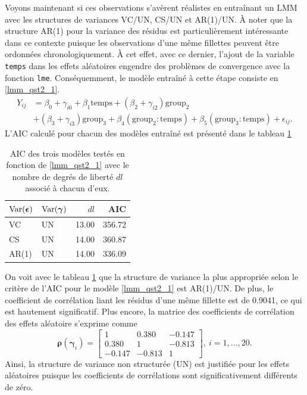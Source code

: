 \documentclass{article}
\begin{document}
		Voyons maintenant si ces observations s'avèrent réalistes en entraînant un LMM avec les structures de variances VC/UN, CS/UN et AR(1)/UN. À noter que la structure AR(1) pour la variance des résidus est particulièrement intéressante dans ce contexte puisque les observations d'une même fillettes peuvent être ordonnées chronologiquement.
		À cet effet, avec ce dernier, l'ajout de la variable \texttt{temps} dans les effets aléatoires engendre des problèmes de convergence avec la fonction \texttt{lme}. Conséquemment, le modèle entraîné à cette étape consiste en \eqref{lmm_qst2_1}.
		\begin{align}\label{lmm_qst2_1}
			Y_{ij} &= \beta_0 + \gamma_{i0} + \beta_1 \mathrm{temps} + (\beta_2 + \gamma_{i2}) \mathrm{group_2} \\
			&+ (\beta_3 + \gamma_{i3}) \mathrm{group_3} + \beta_4 (\mathrm{group_2:temps}) + \beta_5 (\mathrm{group_3:temps}) + \epsilon_{ij}. \nonumber
		\end{align}
		L'AIC calculé pour chacun des modèles entraîné est présenté dans le tableau \ref{tbl_AIC_Qst2}
		\begin{table}[H]
			\centering
			\begin{tabular}{ll|rr}
				\hline
				$\mathrm{Var}(\boldsymbol{\epsilon})$ & $\mathrm{Var}(\boldsymbol{\gamma})$ & $dl$ & AIC \\ 
				\hline
				VC & UN & 13.00 & 356.72 \\ 
				CS & UN & 14.00 & 360.87 \\ 
				AR(1) & UN & 14.00 & 336.09 \\ 
				\hline
			\end{tabular}
			\caption{AIC des trois modèles testés en fonction de \eqref{lmm_qst2_1} avec le nombre de degrés de liberté $dl$ associé à chacun d'eux.}
			\label{tbl_AIC_Qst2}
		\end{table}
	On voit avec le tableau \ref{tbl_AIC_Qst2} que la structure de variance la plus appropriée selon le critère de l'AIC pour le modèle \eqref{lmm_qst2_1} est AR(1)/UN. De plus, le coefficient de corrélation liant les résidus d'une même fillette est de 0.9041, ce qui est hautement significatif. Plus encore, la matrice des coefficients de corrélation des effets aléatoire s'exprime comme
	$$
		\boldsymbol{\rho}(\boldsymbol{\gamma}_i) = 
		\begin{bmatrix}
			1 & 0.380 & -0.147 \\
			0.380 & 1 & -0.813 \\
			-0.147 & -0.813 & 1
		\end{bmatrix},\ i=1,\dots, 20.
	$$
	Ainsi, la structure de variance non structurée (UN) est justifiée pour les effets aléatoires puisque les coefficients de corrélations sont significativement différents de zéro.\\
	
\end{document}
